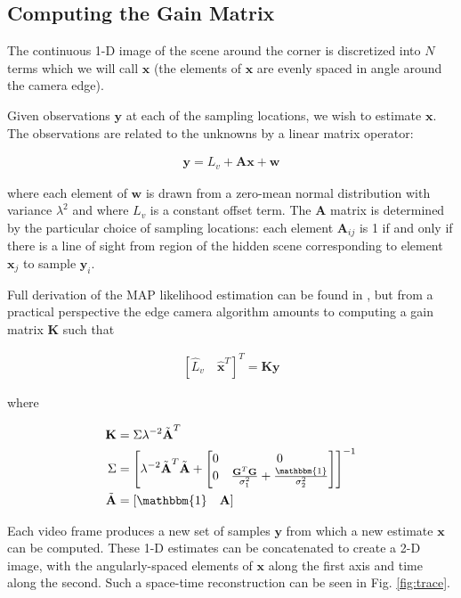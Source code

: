 \documentclass{article}
\begin{document}
\subsection{Computing the Gain Matrix}
\label{sec:gain}

The continuous 1-D image of the scene around the corner is discretized into $N$ terms which we will call $\textbf{x}$ (the elements of $\textbf{x}$ are evenly spaced in angle around the camera edge).

Given observations $\textbf{y}$ at each of the sampling locations, we wish to estimate $\textbf{x}$. The observations are related to the unknowns by a linear matrix operator:

\begin{align}
\textbf{y} = L_v + \textbf{A} \textbf{x} + \textbf{w}
\end{align}

where each element of $\textbf{w}$ is drawn from a zero-mean normal distribution with variance $\lambda^2$ and where $L_v$ is a constant offset term. The $\textbf{A}$ matrix is determined by the particular choice of sampling locations: each element $\textbf{A}_{ij}$ is 1 if and only if there is a line of sight from region of the hidden scene corresponding to element $\textbf{x}_j$ to sample $\textbf{y}_i$. 

Full derivation of the MAP likelihood estimation can be found in \cite{bouman_turningcornerscameras2017}, but from a practical perspective the edge camera algorithm amounts to computing a gain matrix $\textbf{K}$ such that

\begin{align}
	\left[ \hat{L}_v \quad \hat{\textbf{x}}^T \right]^T = \textbf{K} \textbf{y}
\end{align}

where 

\begin{align}
	\textbf{K} &= \Sigma \lambda^{-2} \tilde{\textbf{A}}^T\\
	\Sigma &= \left[ \lambda^{-2} \tilde{\textbf{A}}^T \tilde{\textbf{A}} + \begin{bmatrix} 0 & 0 \\ 0 & \frac{\textbf{G}^T \textbf{G}}{\sigma_1^2} + \frac{\mathbbm{1}}{\sigma_2^2} \end{bmatrix} \right]^{-1} \\
	\tilde{\textbf{A}} &= \left[ \mathbbm{1} \quad \textbf{A} \right]
\end{align}

Each video frame produces a new set of samples $\textbf{y}$ from which a new estimate $\textbf{x}$ can be computed. These 1-D estimates can be concatenated to create a 2-D image, with the angularly-spaced elements of $\textbf{x}$ along the first axis and time along the second. Such a space-time reconstruction can be seen in Fig. \ref{fig:trace}. 
\end{document}
